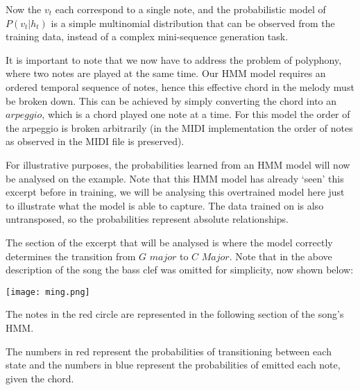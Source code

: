\documentclass[bsc,singlespacing,logo, parskip, deptreport]{infthesis}
\begin{document}
\begin{center}
\end{center}

Now the $v_t$ each correspond to a single note, and the probabilistic model of $P(v_t | h_t)$ is a simple multinomial distribution that can be observed from the training data, instead of a complex mini-sequence generation task.

It is important to note that we now have to address the problem of polyphony, where two notes are played at the same time. Our HMM model requires an ordered temporal sequence of notes, hence this effective chord in the melody must be broken down. This can be achieved by simply converting the chord into an $arpeggio$, which is a chord played one note at a time. For this model the order of the arpeggio is broken arbitrarily (in the MIDI implementation the order of notes as observed in the MIDI file is preserved).

For illustrative purposes, the probabilities learned from an HMM model will now be analysed on the example. Note that this HMM model has already `seen' this excerpt before in training, we will be analysing this overtrained model here just to illustrate what the model is able to capture. The data trained on is also untransposed, so the probabilities represent absolute relationships.

The section of the excerpt that will be analysed is where the model correctly determines the transition from $G$ $major$ to $C$ $Major$. Note that in the above description of the song the bass clef was omitted for simplicity, now shown below:

\begin{center}
  \texttt{[image: ming.png]}
\end{center}

The notes in the red circle are represented in the following section of the song's HMM.

The numbers in red represent the probabilities of transitioning between each state and the numbers in blue represent the probabilities of emitted each note, given the chord.
\end{document}
